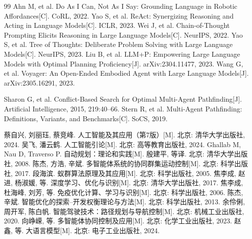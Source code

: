 \documentclass[a4paper,12pt,openany]{ctexbook}
\theoremstyle{definition}
\theoremstyle{plain}
\begin{document}
\begin{thebibliography}{99}
 Ahn M, et al. Do As I Can, Not As I Say: Grounding Language in Robotic Affordances[C]. CoRL, 2022.
 Yao S, et al. ReAct: Synergizing Reasoning and Acting in Language Models[C]. ICLR, 2023.
 Wei J, et al. Chain-of-Thought Prompting Elicits Reasoning in Large Language Models[C]. NeurIPS, 2022.
 Yao S, et al. Tree of Thoughts: Deliberate Problem Solving with Large Language Models[C]. NeurIPS, 2023.
 Liu B, et al. LLM+P: Empowering Large Language Models with Optimal Planning Proficiency[J]. arXiv:2304.11477, 2023.
 Wang G, et al. Voyager: An Open-Ended Embodied Agent with Large Language Models[J]. arXiv:2305.16291, 2023.

 Sharon G, et al. Conflict-Based Search for Optimal Multi-Agent Pathfinding[J]. Artificial Intelligence, 2015, 219:40--66.
 Stern R, et al. Multi-Agent Pathfinding: Definitions, Variants, and Benchmarks[C]. SoCS, 2019.


 蔡自兴, 刘丽珏, 蔡竞峰. 人工智能及其应用（第7版）[M]. 北京: 清华大学出版社, 2024.
 吴飞, 潘云鹤. 人工智能引论[M]. 北京: 高等教育出版社, 2024.
 Ghallab M, Nau D, Traverso P. 自动规划：理论和实践[M]. 殷建平, 等译. 北京: 清华大学出版社, 2008.
 陈杰, 方浩, 辛斌. 多智能体系统的协同群集运动控制[M]. 北京: 科学出版社, 2017.
 段海滨. 蚁群算法原理及其应用[M]. 北京: 科学出版社, 2005.
 焦李成, 赵进, 杨淑媛, 等. 深度学习、优化与识别[M]. 北京: 清华大学出版社, 2017.
 焦李成, 杜海峰, 刘芳, 等. 免疫优化计算、学习与识别[M]. 北京: 科学出版社, 2006.
 陈杰, 辛斌. 智能优化的探索--开发权衡理论与方法[M]. 北京: 科学出版社, 2013.
 余伶俐, 周开军, 陈白帆. 智能驾驶技术：路径规划与导航控制[M]. 北京: 机械工业出版社, 2020.
 向峥嵘, 等. 多智能体协同控制及应用[M]. 北京: 化学工业出版社, 2023.
 赵鑫, 等. 大语言模型[M]. 北京: 电子工业出版社, 2024.



\end{thebibliography}
\end{document}

